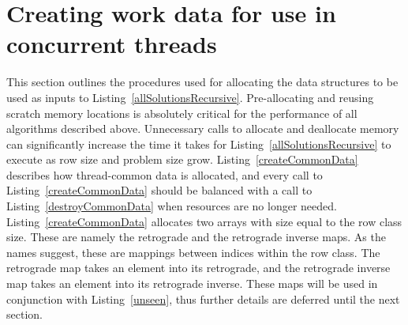\section{Creating work data for use in concurrent threads}

This section outlines the procedures used for allocating the data structures to be used as inputs to Listing~\ref{allSolutionsRecursive}. Pre-allocating and reusing scratch memory locations is absolutely critical for the performance of all algorithms described above. Unnecessary calls to allocate and deallocate memory can significantly increase the time it takes for Listing~\ref{allSolutionsRecursive} to execute as row size and problem size grow. Listing~\ref{createCommonData} describes how thread-common data is allocated, and every call to Listing~\ref{createCommonData} should be balanced with a call to Listing~\ref{destroyCommonData} when resources are no longer needed. Listing~\ref{createCommonData} allocates two arrays with size equal to the row class size. These are namely the retrograde and the retrograde inverse maps. As the names suggest, these are mappings between indices within the row class. The retrograde map takes an element into its retrograde, and the retrograde inverse map takes an element into its retrograde inverse. These maps will be used in conjunction with Listing~\ref{unseen}, thus further details are deferred until the next section.


